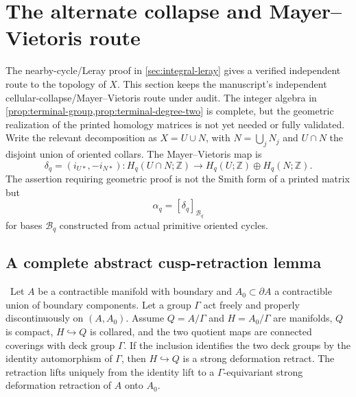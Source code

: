 \section{The alternate collapse and Mayer--Vietoris route}

The nearby-cycle/Leray proof in \cref{sec:integral-leray} gives a verified
independent route to the topology of $X$.  This section keeps the manuscript's independent
cellular-collapse/Mayer--Vietoris route under audit.  The integer algebra in
\cref{prop:terminal-group,prop:terminal-degree-two} is complete, but the
geometric realization of the printed homology matrices is not yet needed or
fully validated.  Write the relevant decomposition as
$X=U\cup N$, with $N=\bigcup_jN_j$ and $U\cap N$ the disjoint union of
oriented collars.  The Mayer--Vietoris map is
\[
\delta_q=(i_{U*},-i_{N*}):
H_q(U\cap N;\mathbb Z)\longrightarrow
H_q(U;\mathbb Z)\oplus H_q(N;\mathbb Z).
\tag{4.1}
\]
The assertion requiring geometric proof is not the Smith form of a printed
matrix but
\[
\alpha_q=[\delta_q]_{\mathcal B_q}
\tag{4.2}
\]
for bases $\mathcal B_q$ constructed from actual primitive oriented cycles.

\subsection{A complete abstract cusp-retraction lemma}

\begin{proposition}\label{prop:topological-spine}
\Verified\ Let $A$ be a contractible manifold with boundary and
$A_0\subset\partial A$ a contractible union of boundary components.  Let a
group $\Gamma$ act freely and properly discontinuously on $(A,A_0)$.  Assume
$Q=A/\Gamma$ and $H=A_0/\Gamma$ are manifolds, $Q$ is compact,
$H\hookrightarrow Q$ is collared, and the two quotient maps are connected
coverings with deck group $\Gamma$.  If the inclusion identifies the two
deck groups by the identity automorphism of $\Gamma$, then
$H\hookrightarrow Q$ is a strong deformation retract.  The retraction lifts
uniquely from the identity lift to a $\Gamma$-equivariant strong deformation
retraction of $A$ onto $A_0$.
\end{proposition}

